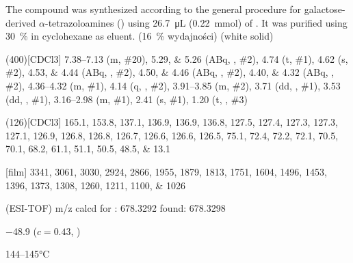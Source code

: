 The compound was synthesized according to the general procedure for galactose-derived $\alpha$-tetrazoloamines () using \SI{26.7}{\micro\liter} (\SI{0.22}{\milli\mol}) of .
It was purified using \SI{30}{\percent}  in cyclohexane as eluent.
(\SI{16}{\percent} wydajności) (white solid)
\begin{fullexp}
	\NMR(400)[CDCl3] \numrange{7.38}{7.13} (m, \#{20}), \numlist{5.29;5.26} (ABq, , \#{2}), \num{4.74} (t, \#{1}), \num{4.62} (s, \#{2}), \numlist{4.53;4.44} (ABq, , \#{2}), \numlist{4.50;4.46} (ABq, , \#{2}), \numlist{4.40;4.32} (ABq, , \#{2}), \numrange{4.36}{4.32} (m, \#{1}), \num{4.14} (q, , \#{2}), \numrange{3.91}{3.85} (m, \#{2}), \num{3.71} (dd, , \#{1}), \num{3.53} (dd, , \#{1}), \numrange{3.16}{2.98} (m, \#{1}), \num{2.41} (s, \#{1}), \num{1.20} (t, , \#{3})\par\noindent
	(126)[CDCl3] \numlist{165.1; 153.8; 137.1; 136.9; 136.9; 136.8; 127.5; 127.4; 127.3; 127.3; 127.1; 126.9; 126.8; 126.8; 126.7; 126.6; 126.6; 126.5; 75.1; 72.4; 72.2; 72.1; 70.5; 70.1; 68.2; 61.1; 51.1; 50.5; 48.5; 13.1}\par\noindent
	[film] \numlist{3341; 3061; 3030; 2924; 2866; 1955; 1879; 1813; 1751; 1604; 1496; 1453; 1396; 1373; 1308; 1260; 1211; 1100; 1026}\par\noindent
	 (ESI-TOF) m/z calcd for : \num{678.3292} found: \num{678.3298}\par\noindent
	\data{[$\alpha^{23}_D$]~$=$} \num{-48.9} ($c = 0.43$, )\par\noindent
	 \numrange{144}{145}\si{\celsius}
\end{fullexp}

